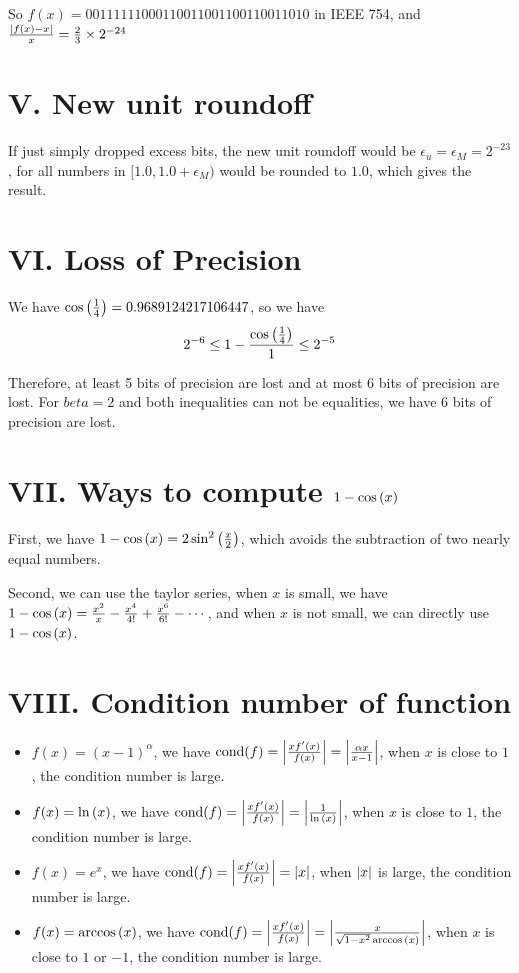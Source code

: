 \documentclass[a4paper]{article}
\begin{document}
So $f(x) = 00111111000110011001100110011010$ in IEEE 754, and $\frac{\abs{f(x) - x}}{x} = \frac{2}{3} \times 2^{-24}$

\section*{V. New unit roundoff}

If just simply dropped excess bits, the new unit roundoff would be $\epsilon_u = \epsilon_M = 2^{-23}$, for all numbers in $[1.0, 1.0+\epsilon_M)$ would be rounded to $1.0$, which gives the result. 

\section*{VI. Loss of Precision}

We have $\cos\qty(\frac{1}{4}) = 0.9689124217106447$, so we have
\begin{equation}
   2^{-6} \leq 1 - \frac{\cos\qty(\frac{1}{4})}{1} \leq 2^{-5}
\end{equation}

Therefore, at least 5 bits of precision are lost and at most 6 bits of precision are lost. For $beta=2$ and both inequalities can not be equalities, we have $6$ bits of precision are lost.

\section*{VII. Ways to compute $1-\cos\qty(x)$}

First, we have $1-\cos\qty(x) = 2\sin^2\qty(\frac{x}{2})$, which avoids the subtraction of two nearly equal numbers.

Second, we can use the taylor series, when $x$ is small, we have $1-\cos\qty(x) = \frac{x^2}{x} - \frac{x^4}{4!} + \frac{x^6}{6!} - \cdots$, and when $x$ is not small, we can directly use $1-\cos\qty(x)$.


\section*{VIII. Condition number of function}

\begin{itemize}
    \item $f(x) = (x-1)^{\alpha}$, we have $\mathrm{cond}(f) = \abs{\frac{x f^\prime(x)}{f(x)}} = \abs{\frac{\alpha x}{x-1}}$, when $x$ is close to $1$, the condition number is large.
    \item $f(x) = \ln\qty(x)$, we have $\mathrm{cond}(f) = \abs{\frac{x f^\prime(x)}{f(x)}} = \abs{\frac{1}{\ln\qty(x)}}$, when $x$ is close to $1$, the condition number is large.
    \item $f(x) = e^x$, we have $\mathrm{cond}(f) = \abs{\frac{x f^\prime(x)}{f(x)}} = \abs{x}$, when $\abs{x}$ is large, the condition number is large.
    \item $f(x) = \arccos\qty(x)$, we have $\mathrm{cond}(f) = \abs{\frac{x f^\prime(x)}{f(x)}} = \abs{\frac{x}{\sqrt{1-x^2} \arccos\qty(x)}}$, when $x$ is close to $1$ or $-1$, the condition number is large.
\end{itemize}
\end{document}

